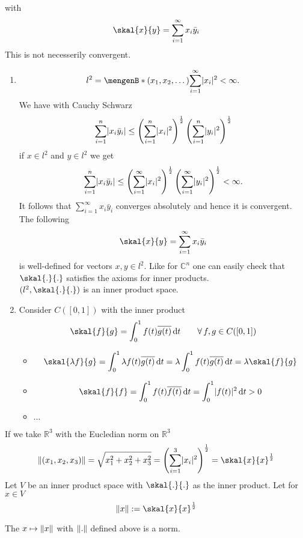 with
\[
	\skal{x}{y} = \sum^{\infty}_{i=1} x_i \bar{y}_i 
\]
This is not necesserily convergent.
\begin{beispiele}
	\begin{enumerate}[(1)]
		\item 	\[
		l^2 = \set[(x_1,x_2, \dots)]{ \sum^{\infty}_{i=1} \abs{x_i}^2 < \infty}.
	\]
	We have with Cauchy Schwarz
	\[
		\sum^{n}_{i=1} \lvert x_i \bar{y}_i\rvert \leq \left( \sum^{n}_{i=1} \lvert x_i\rvert^2 \right)^{\frac{1}{2}} \left( \sum^{n}_{i=1} \lvert y_i\rvert^2 \right)^{\frac{1}{2}}
	\]
	if $x \in l^2$ and $y \in l^2$ we get
	\begin{align*}
		\sum^{n}_{i=1}\lvert x_i \bar{y}_i\rvert \leq \left( \sum^{\infty}_{i=1} \lvert x_i\rvert^2 \right)^{\frac{1}{2}} \left( \sum_{i=1}^{\infty} \lvert y_i\rvert^2 \right)^{\frac{1}{2}} < \infty.
	\end{align*}
	It follows that $\sum_{i=1}^{\infty} x_i \bar{y}_i$ converges absolutely and hence it is convergent. The following 
	\[
		\skal{x}{y} = \sum^{\infty}_{i=1} x_i \bar{y}_i
	\]
	is well-defined for vectors $x,y \in l^2$. Like for $\mathbb{C}^n$ one can easily check that $\skal{.}{.}$ satisfies the axioms for inner products. \\
	$(l^2, \skal{.}{.})$ is an inner product space.
	\item Consider $C([0,1])$ with the inner product
	\[
		\skal{f}{g} = \int_{0}^{1}f(t) \overline{g(t)} \,\mathrm{d}t \qquad \forall\, f,g \in C([0,1])
	\]
	\begin{itemize}
		\item 	\[
			\skal{\lambda f}{g} = \int_{0}^{1}\lambda f(t) \overline{g(t)} \,\mathrm{d}t = \lambda \int_{0}^{1}f(t) \overline{g(t)} \,\mathrm{d}t = \lambda \skal{f}{g}
		\]
		\item \[
			\skal{f}{f} = \int_{0}^{1}f(t) \overline{f(t)} \,\mathrm{d}t = \int_{0}^{1} \abs{f(t)}^2 \,\mathrm{d}t >0
		\]	
		\item $\dots$
	\end{itemize}
	\end{enumerate}
\end{beispiele}
If we take $\mathbb{R}^3$ with the Eucledian norm on $\mathbb{R}^3$
\[
	\norm{(x_1,x_2,x_3)} = \sqrt{x_1^2 + x_2^2 + x_3^2} = \left( \sum_{i=1}^{3} \abs{x_i}^2 \right)^{\frac{1}{2}} = \skal{x}{x}^{\frac{1}{2}}
\]
Let $V$ be an inner product space with $\skal{.}{.}$ as the inner product. Let for $x \in V$
\[
	\norm{x} := \skal{x}{x}^{\frac{1}{2}}
\]
\begin{satz}
	The $x \mapsto  \norm{x}$ with $\norm{.}$ defined above is a norm.
\end{satz}
